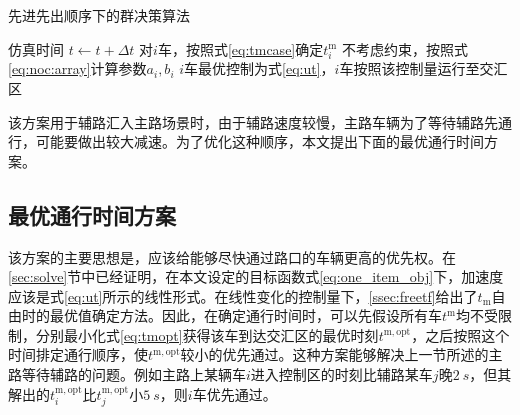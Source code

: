 \begin{algorithm}
\caption{先进先出顺序下的群决策算法}
\label{alg:fifo}
\begin{algorithmic}
  \Statex
    \State 仿真时间 $t\gets t+\Delta t$
        \State 对$i$车，按照式\eqref{eq:tmcase}确定$t_i^\mathrm{m}$
        \State 不考虑约束，按照式\eqref{eq:noc:array}计算参数$a_i, b_i$
        \State $i$车最优控制为式\eqref{eq:ut}，$i$车按照该控制量运行至交汇区
      \EndFor
    \EndIf
  \EndWhile
\end{algorithmic}
\end{algorithm}

该方案用于辅路汇入主路场景时，由于辅路速度较慢，主路车辆为了等待辅路先通行，可能要做出较大减速。为了优化这种顺序，本文提出下面的最优通行时间方案。

\subsection{最优通行时间方案}
该方案的主要思想是，应该给能够尽快通过路口的车辆更高的优先权。在\ref{sec:solve}节中已经证明，在本文设定的目标函数式\eqref{eq:one_item_obj}下，加速度应该是式\eqref{eq:ut}所示的线性形式。在线性变化的控制量下，\ref{ssec:freetf}给出了$t_\mathrm{m}$自由时的最优值确定方法。因此，在确定通行时间时，可以先假设所有车$t^\mathrm{m}$均不受限制，分别最小化式\eqref{eq:tmopt}获得该车到达交汇区的最优时刻$t^\mathrm{m,opt}$，之后按照这个时间排定通行顺序，使$t^\mathrm{m,opt}$较小的优先通过。这种方案能够解决上一节所述的主路等待辅路的问题。例如主路上某辆车$i$进入控制区的时刻比辅路某车$j$晚$\SI{2}{s}$，但其解出的$t_i^\mathrm{m,opt}$比$t_j^\mathrm{m,opt}$小$\SI{5}{s}$，则$i$车优先通过。

